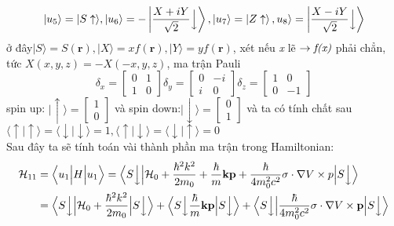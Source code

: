 \begin{equation}
|u_5\rangle = |S\uparrow\rangle, |u_6\rangle=-\left|\frac{X+iY}{\sqrt{2}}\Bigl\downarrow\right\rangle, |u_7\rangle=\left |Z\uparrow\right\rangle, u_8\rangle=\left |\frac{X-iY}{\sqrt{2}}\Bigl\downarrow\right\rangle
\end{equation}
ở đây$|S\rangle=S(\mathbf{r}),|X\rangle=xf(\mathbf{r}),|Y\rangle=yf(\mathbf{r})$, xét nếu \emph{x} lẽ $\rightarrow \emph{f(x)} $ phải chẳn, tức $X(x,y,z)=-X(-x,y,z)$,
 ma trận Pauli
\begin{equation}
\delta_x=\begin{bmatrix}
0 & 1 \\
1 & 0
\end{bmatrix}
\delta_y=\begin{bmatrix}
0 & -i \\
i & 0
\end{bmatrix}
\delta_z=\begin{bmatrix}
1 & 0 \\
0 & -1
\end{bmatrix}
\end{equation}
spin up: $|\uparrow\rangle=\begin{bmatrix}
1 \\ 0
\end{bmatrix}$ và spin down:$|\downarrow\rangle=\begin{bmatrix}
0 \\1
\end{bmatrix}$ và ta có tính chất sau$\langle\uparrow|\uparrow\rangle=\langle\downarrow|\downarrow\rangle=1,\langle\uparrow|\downarrow\rangle=\langle\downarrow|\uparrow\rangle=0$ \\
Sau đây ta sẽ tính toán vài thành phần ma trận trong Hamiltonian: 
\begin{align*}
\mathcal{H}_{11}&=\Bigl\langle u_1\Bigl\vert H \Bigr\vert u_1\Bigr\rangle =
\Bigl\langle S\Bigl \downarrow\Bigl\vert \mathcal{H}_0 + \frac{\hbar^2 k^2}{2m_0} +\frac{\hbar}{m}\mathbf{kp}+\frac{\hbar}{4m_0^2c^2}\sigma\cdot\nabla V\times p \Bigr\vert S\Bigr\downarrow \Bigr\rangle  \\
&=\Bigl\langle S\Bigl\downarrow \Bigl\vert \mathcal{H}_0+\frac{\hbar^2 k^2}{2m_0}\Bigr\vert S\Bigr\downarrow \Bigr\rangle +
\Bigl\langle S\Bigl\downarrow\frac{\hbar}{m}\mathbf{kp} \Bigr\vert S\Bigr\downarrow\Bigr\rangle +
\Bigl\langle S\Bigl\downarrow \Bigr\vert \frac{\hbar}{4m_0^2c^2}\sigma\cdot\nabla V\times \mathbf{p}\Bigr\vert S\Bigr\downarrow \Bigr\rangle
\end{align*}

